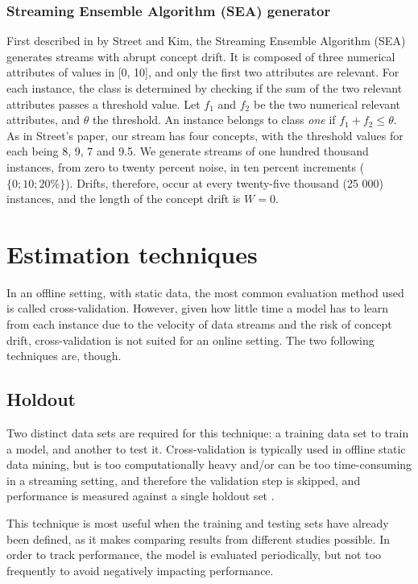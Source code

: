 \subsubsection{Streaming Ensemble Algorithm (SEA) generator}
First described in \cite{street2001streaming} by Street and Kim, the Streaming Ensemble Algorithm (SEA) generates streams with abrupt concept drift. It is composed of three numerical attributes of values in [0, 10], and only the first two attributes are relevant. For each instance, the class is determined by checking if the sum of the two relevant attributes passes a threshold value. Let $f_1$ and $f_2$ be the two numerical relevant attributes, and $\theta$ the threshold. An instance belongs to class \textit{one} if $f_1 + f_2 \leq \theta$. As in Street's paper, our stream has four concepts, with the threshold values for each being 8, 9, 7 and 9.5. We generate streams of one hundred thousand instances, from zero to twenty percent noise, in ten percent increments ($\{0; 10; 20\%\}$). Drifts, therefore, occur at every twenty-five thousand (25 000) instances, and the length of the concept drift is $W=0$.

\section{Estimation techniques}
In an offline setting, with static data, the most common evaluation method used is called cross-validation. However, given how little time a model has to learn from each instance due to the velocity of data streams and the risk of concept drift, cross-validation is not suited for an online setting. The two following techniques are, though.

\subsection{Holdout}
Two distinct data sets are required for this technique: a training data set to train a model, and another to test it.  Cross-validation is typically used in offline static data mining, but is too computationally heavy and/or can be too time-consuming in a streaming setting, and therefore the validation step is skipped, and performance is measured against a single holdout set \cite{bifet2009data}.
 
This technique is most useful when the training and testing sets have already been defined, as it makes comparing results from different studies possible.
In order to track performance, the model is evaluated periodically, but not too frequently to avoid negatively impacting performance.

